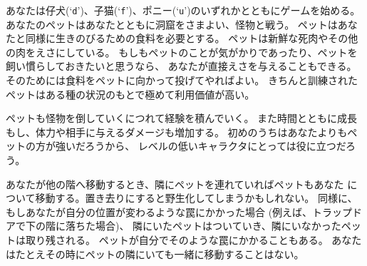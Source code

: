 あなたは仔犬(`{\tt d}')、子猫(`{\tt f}')、ポニー(`{\tt u}')のいずれかとともにゲームを始める。
あなたのペットはあなたとともに洞窟をさまよい、怪物と戦う。
ペットはあなたと同様に生きのびるための食料を必要とする。
ペットは新鮮な死肉やその他の肉をえさにしている。
もしもペットのことが気がかりであったり、ペットを飼い慣らしておきたいと思うなら、
あなたが直接えさを与えることもできる。
そのためには食料をペットに向かって投げてやればよい。
きちんと訓練されたペットはある種の状況のもとで極めて利用価値が高い。

ペットも怪物を倒していくにつれて経験を積んでいく。
また時間とともに成長もし、体力や相手に与えるダメージも増加する。
初めのうちはあなたよりもペットの方が強いだろうから、
レベルの低いキャラクタにとっては役に立つだろう。

あなたが他の階へ移動するとき、隣にペットを連れていればペットもあなた
について移動する。置き去りにすると野生化してしまうかもしれない。
同様に、もしあなたが自分の位置が変わるような罠にかかった場合
(例えば、トラップドアで下の階に落ちた場合)、
隣にいたペットはついていき、隣にいなかったペットは取り残される。
ペットが自分でそのような罠にかかることもある。
あなたはたとえその時にペットの隣にいても一緒に移動することはない。

